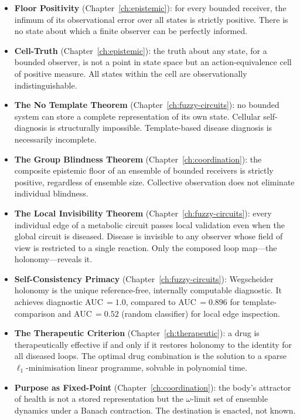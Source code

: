 \begin{itemize}
\item \textbf{Floor Positivity} (Chapter~\ref{ch:epistemic}): for every
  bounded receiver, the infimum of its observational error over all states
  is strictly positive.  There is no state about which a finite observer
  can be perfectly informed.

\item \textbf{Cell-Truth} (Chapter~\ref{ch:epistemic}): the truth about
  any state, for a bounded observer, is not a point in state space but an
  action-equivalence cell of positive measure.  All states within the cell
  are observationally indistinguishable.

\item \textbf{The No Template Theorem}
  (Chapter~\ref{ch:fuzzy-circuits}): no bounded system can store a
  complete representation of its own state.  Cellular self-diagnosis is
  structurally impossible.  Template-based disease diagnosis is necessarily
  incomplete.

\item \textbf{The Group Blindness Theorem}
  (Chapter~\ref{ch:coordination}): the composite epistemic floor of an
  ensemble of bounded receivers is strictly positive, regardless of
  ensemble size.  Collective observation does not eliminate individual
  blindness.

\item \textbf{The Local Invisibility Theorem}
  (Chapter~\ref{ch:fuzzy-circuits}): every individual edge of a
  metabolic circuit passes local validation even when the global circuit
  is diseased.  Disease is invisible to any observer whose field of view
  is restricted to a single reaction.  Only the composed loop map---the
  holonomy---reveals it.

\item \textbf{Self-Consistency Primacy}
  (Chapter~\ref{ch:fuzzy-circuits}): Wegscheider holonomy is the unique
  reference-free, internally computable diagnostic.  It achieves
  diagnostic AUC\,$=1.0$, compared to AUC\,$=0.896$ for
  template-comparison and AUC\,$=0.52$ (random classifier) for local edge
  inspection.

\item \textbf{The Therapeutic Criterion}
  (Chapter~\ref{ch:therapeutic}): a drug is therapeutically effective if
  and only if it restores holonomy to the identity for all diseased loops.
  The optimal drug combination is the solution to a sparse
  $\ell_1$-minimisation linear programme, solvable in polynomial time.

\item \textbf{Purpose as Fixed-Point}
  (Chapter~\ref{ch:coordination}): the body's attractor of health is not
  a stored representation but the $\omega$-limit set of ensemble dynamics
  under a Banach contraction.  The destination is enacted, not known.
\end{itemize}

